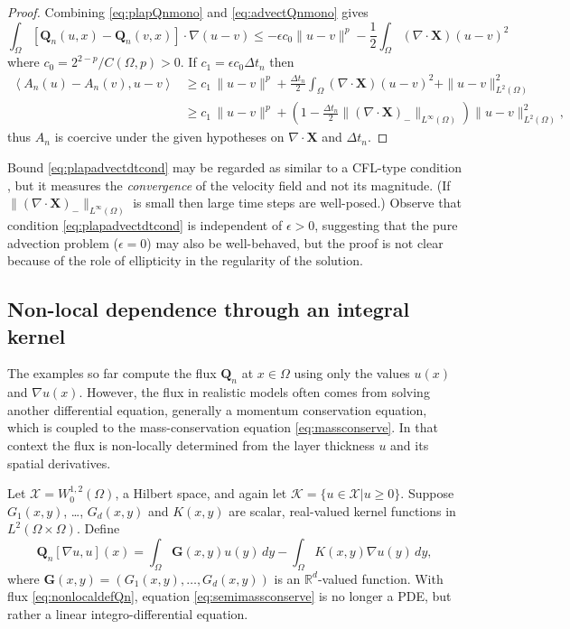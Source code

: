 \documentclass[final,onefignum]{siamart190516}
\newcommand\bG{\mathbf{G}}
\newcommand\bQ{\mathbf{Q}}
\newcommand\bX{\mathbf{X}}
\newcommand{\Div}{\nabla\cdot}
\newcommand\eps{\epsilon}
\newcommand{\grad}{\nabla}
\newcommand{\ip}[2]{\ensuremath{\left<#1,#2\right>}}
\newcommand\RR{\mathbb{R}}
\begin{document}
\begin{proof} Combining \eqref{eq:plapQnmono} and \eqref{eq:advectQnmono} gives
\begin{equation*}
\int_\Omega \left[\bQ_n(u,x) - \bQ_n(v,x)\right] \cdot \grad (u - v) \le - \eps c_0 \|u-v\|^p - \frac{1}{2} \int_\Omega (\Div\bX) (u-v)^2
\end{equation*}
where $c_0=2^{2-p}/C(\Omega,p)>0$.  If $c_1 = \eps c_0 \Delta t_n$ then
\begin{align*}
\ip{A_n(u) - A_n(v)}{u-v} &\ge c_1\, \|u-v\|^p + \frac{\Delta t_n}{2} \int_\Omega (\Div\bX) (u-v)^2 + \|u-v\|_{L^2(\Omega)}^2 \\
   &\ge c_1\, \|u-v\|^p + \left(1 - \frac{\Delta t_n}{2} \|(\Div \bX)_-\|_{L^\infty(\Omega)}\right) \|u-v\|_{L^2(\Omega)}^2,
\end{align*}
thus $A_n$ is coercive under the given hypotheses on $\Div \bX$ and $\Delta t_n$. \end{proof}

Bound \eqref{eq:plapadvectdtcond} may be regarded as similar to a CFL-type condition \cite{LeVeque2002}, but it measures the \emph{convergence} of the velocity field and not its magnitude.  (If $\|(\Div \bX)_-\|_{L^\infty(\Omega)}$ is small then large time steps are well-posed.) Observe that condition \eqref{eq:plapadvectdtcond} is independent of $\eps>0$, suggesting that the pure advection problem ($\eps = 0$) may also be well-behaved, but the proof is not clear because of the role of ellipticity in the regularity of the solution.


\subsection{Non-local dependence through an integral kernel} \label{subsec:nonlocal}   The examples so far compute the flux $\bQ_n$ at $x\in\Omega$ using only the values $u(x)$ and $\grad u(x)$.  However, the flux in realistic models often comes from solving another differential equation, generally a momentum conservation equation, which is coupled to the mass-conservation equation \eqref{eq:massconserve}.  In that context the flux is non-locally determined from the layer thickness $u$ and its spatial derivatives.

Let $\mathcal{X} = W_0^{1,2}(\Omega)$, a Hilbert space, and again let $\mathcal{K}=\{u\in\mathcal{X}|u\ge 0\}$.  Suppose $G_1(x,y)$, \dots, $G_d(x,y)$ and $K(x,y)$ are scalar, real-valued kernel functions in $L^2(\Omega\times \Omega)$.  Define
\begin{equation}
\bQ_n[\grad u,u](x) = \int_\Omega \bG(x,y) u(y)\,dy - \int_\Omega K(x,y) \grad u(y)\,dy, \label{eq:nonlocaldefQn}
\end{equation}
where $\bG(x,y) = (G_1(x,y), \dots, G_d(x,y))$ is an $\RR^d$-valued function.  With flux \eqref{eq:nonlocaldefQn}, equation \eqref{eq:semimassconserve} is no longer a PDE, but rather a linear integro-differential equation.
\end{document}

